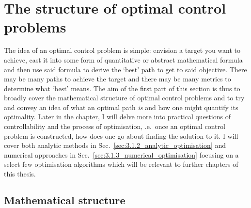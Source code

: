 \section{The structure of optimal control problems}\label{sec:3.1_structure_quantum_control}

The idea of an optimal control problem is simple: envision a target you want to achieve, cast it into some form of quantitative or abstract mathematical formula and then use said formula to derive the `best' path to get to said objective. There may be many paths to achieve the target and there may be many metrics to determine what `best' means. The aim of the first part of this section is thus to broadly cover the mathematical structure of optimal control problems and to try and convey an idea of what an optimal path \emph{is} and how one might quantify its optimality. Later in the chapter, I will delve more into practical questions of controllability and the process of optimisation, \@i.e.~once an optimal control problem is constructed, how does one go about finding the solution to it. I will cover both analytic methods in Sec.~\ref{sec:3.1.2_analytic_optimisation} and numerical approaches in Sec.~\ref{sec:3.1.3_numerical_optimisation} focusing on a select few optimisation algorithms which will be relevant to further chapters of this thesis. 

\subsection{Mathematical structure}\label{sec:3.1.1_mathematical_structure}

